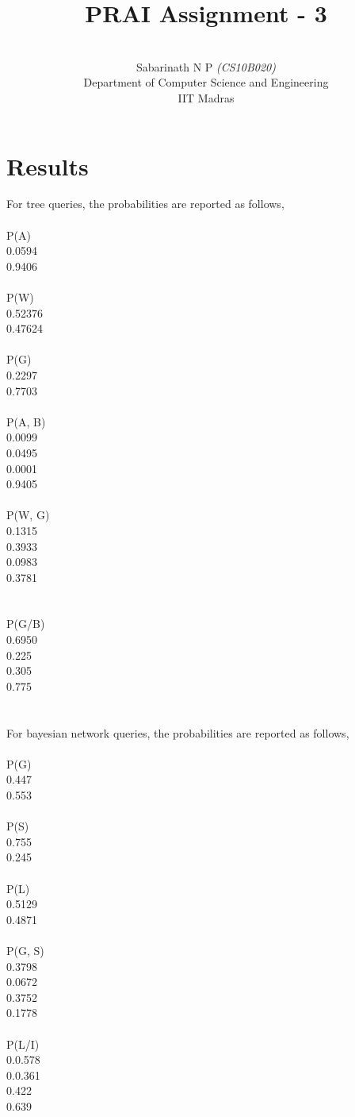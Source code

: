\documentclass[a4paper,10pt]{report}
\title{\huge{\textbf{PRAI Assignment - 3}}}
\author{\\[0.5cm] Sabarinath N P \emph{(CS10B020)}
	\\[0.5cm] Department of Computer Science and Engineering \\[0.2cm]
	IIT Madras\\[1.0cm]
}
\begin{document}
\renewcommand{\thesection}{1.\arabic{section}}

\maketitle
\setcounter{tocdepth}{2}

\section{Results}
For tree queries, the probabilities are reported as follows,
\\\\
P(A)\\
0.0594
\\
0.9406
\\\\
P(W)\\
0.52376
\\
0.47624
\\\\
P(G)\\
0.2297
\\
0.7703
\\\\
P(A, B)\\
0.0099\\
0.0495\\
0.0001\\
0.9405
\\\\
P(W, G)\\
0.1315\\
0.3933\\
0.0983\\
0.3781\\
\\\\
P(G/B) \\
0.6950\\
0.225\\
0.305\\
0.775\\
\\\\
For bayesian network queries, the probabilities are reported as follows,
\\\\
P(G)\\
0.447\\
0.553\\\\
P(S)\\
0.755\\
0.245\\\\
P(L)\\
0.5129 \\
0.4871\\\\
P(G, S)\\
0.3798\\
0.0672\\
0.3752\\
0.1778\\\\
P(L/I)\\
0.0.578\\
0.0.361 \\
0.422 \\
0.639
\end{document}
